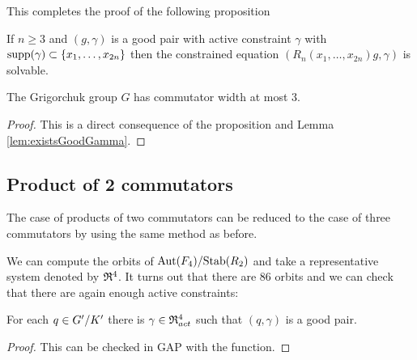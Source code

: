 \documentclass[a4paper,11pt]{amsart}
\begin{document}
This completes the proof of the following proposition
\begin{pro}\label{pro:solvableConstraintedEquations}
 If $n\geq3$ and $(g,\gamma)$ is a good pair with active constraint $\gamma$ with $\textup{supp}(\gamma)\subset\{x_1,\ldots,x_{2n}\}$
 then the constrained equation $(R_n(x_1,\ldots,x_{2n})g,\gamma)$ is solvable. 
\end{pro}
\begin{cor}
 The Grigorchuk group $G$ has commutator width at most $3$.
\end{cor}
\begin{proof}
 This is a direct consequence of the proposition and Lemma \ref{lem:existsGoodGamma}.
\end{proof}

\subsection{Product of 2 commutators}
The case of products of two commutators can be reduced to the case of three commutators by using the same method as before.

We can compute the orbits of ${\textup{Aut}(F_4)/\textup{Stab}(R_2)}$ and take a representative system denoted by $\mathfrak{R}^4$.
It turns out that there are $86$ orbits and we can check that there are again enough active constraints:
\begin{lem} \label{lem:existsGoodGammaForRed4}
 For each $q\in{G'/K'}$ there is $\gamma\in \mathfrak{R}^4_{act}$ such that $(q,\gamma)$ is a 
 good pair.
\end{lem}
\begin{proof}
 This can be checked in GAP with the function\newline {}.
\end{proof}
\end{document}

